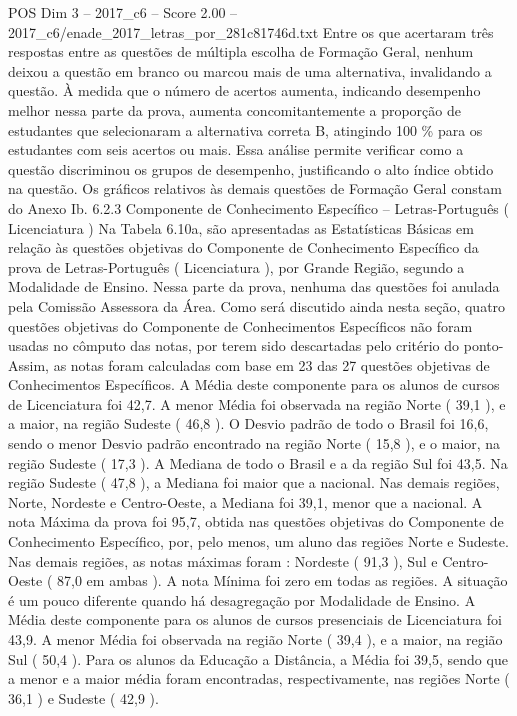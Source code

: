 \begin{textsample}{POS Dim 3 – 2017\_c6 – Score 2.00 – 2017\_c6/enade\_2017\_letras\_por\_281c81746d.txt}
Entre os que acertaram três respostas entre as questões de múltipla escolha de Formação Geral, nenhum deixou a questão em branco ou marcou mais de uma alternativa, invalidando a questão.
À medida que o número de acertos aumenta, indicando desempenho melhor nessa parte da prova, aumenta concomitantemente a proporção de estudantes que selecionaram a alternativa correta B, atingindo 100 \% para os estudantes com seis acertos ou mais.
Essa análise permite verificar como a questão discriminou os grupos de desempenho, justificando o alto índice obtido na questão.
Os gráficos relativos às demais questões de Formação Geral constam do Anexo Ib. 6.2.3 Componente de Conhecimento Específico – Letras-Português ( Licenciatura ) Na Tabela 6.10a, são apresentadas as Estatísticas Básicas em relação às questões objetivas do Componente de Conhecimento Específico da prova de Letras-Português ( Licenciatura ), por Grande Região, segundo a Modalidade de Ensino.
Nessa parte da prova, nenhuma das questões foi anulada pela Comissão Assessora da Área.
Como será discutido ainda nesta seção, quatro questões objetivas do Componente de Conhecimentos Específicos não foram usadas no cômputo das notas, por terem sido descartadas pelo critério do ponto- Assim, as notas foram calculadas com base em 23 das 27 questões objetivas de Conhecimentos Específicos.
A Média deste componente para os alunos de cursos de Licenciatura foi 42,7.
A menor Média foi observada na região Norte ( 39,1 ), e a maior, na região Sudeste ( 46,8 ).
O Desvio padrão de todo o Brasil foi 16,6, sendo o menor Desvio padrão encontrado na região Norte ( 15,8 ), e o maior, na região Sudeste ( 17,3 ).
A Mediana de todo o Brasil e a da região Sul foi 43,5.
Na região Sudeste ( 47,8 ), a Mediana foi maior que a nacional.
Nas demais regiões, Norte, Nordeste e Centro-Oeste, a Mediana foi 39,1, menor que a nacional.
A nota Máxima da prova foi 95,7, obtida nas questões objetivas do Componente de Conhecimento Específico, por, pelo menos, um aluno das regiões Norte e Sudeste.
Nas demais regiões, as notas máximas foram : Nordeste ( 91,3 ), Sul e Centro-Oeste ( 87,0 em ambas ).
A nota Mínima foi zero em todas as regiões.
A situação é um pouco diferente quando há desagregação por Modalidade de Ensino.
A Média deste componente para os alunos de cursos presenciais de Licenciatura foi 43,9.
A menor Média foi observada na região Norte ( 39,4 ), e a maior, na região Sul ( 50,4 ).
Para os alunos da Educação a Distância, a Média foi 39,5, sendo que a menor e a maior média foram encontradas, respectivamente, nas regiões Norte ( 36,1 ) e Sudeste ( 42,9 ).

\end{textsample}
